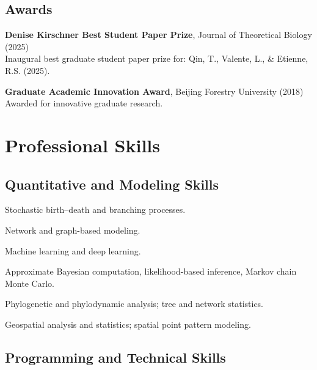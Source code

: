 \subsection*{Awards}
\begin{expitem}
  \item \textbf{Denise Kirschner Best Student Paper Prize}, Journal of Theoretical Biology (2025)\\
        Inaugural best graduate student paper prize for: Qin, T., Valente, L., \& Etienne, R.S. (2025).
  \item \textbf{Graduate Academic Innovation Award}, Beijing Forestry University (2018)\\
        Awarded for innovative graduate research.
\end{expitem}

\section*{Professional Skills}

\subsection*{Quantitative and Modeling Skills}

\begin{expitem}
  \item Stochastic birth--death and branching processes.
  \item Network and graph-based modeling.
  \item Machine learning and deep learning.
  \item Approximate Bayesian computation, likelihood-based inference, Markov chain Monte Carlo.
  \item Phylogenetic and phylodynamic analysis; tree and network statistics.
  \item Geospatial analysis and statistics; spatial point pattern modeling.
\end{expitem}

\subsection*{Programming and Technical Skills}

